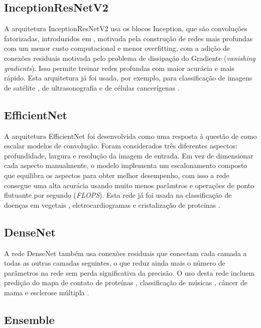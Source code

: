 \subsection{InceptionResNetV2}
\label{section:inceptionresnetv2}
A arquitetura InceptionResNetV2 \cite{InceptionResNetv2} usa os blocos Inception, que são convoluções fatorizadas, introduzidos em \cite{Inception}, motivada pela construção de redes mais profundas com um menor custo computacional e menor overfitting, com a adição de conexões residuais \cite{ResNet} motivada pelo problema de dissipação do Gradiente (\textit{vanishing gradients}). Isso permite treinar redes profundas com maior acurácia e mais rápido. Esta arquitetura já foi usada, por exemplo, para classificação de imagens de satélite \cite{InceptionResNetV2Ex01}, de ultrasonografia \cite{InceptionResNetV2Ex02} e de células cancerígenas \cite{InceptionResNetV2Ex03}.

\subsection{EfficientNet}
\label{section:efficientnet}
A arquitetura EfficientNet \cite{EfficientNet} foi desenvolvida como uma resposta à questão de como escalar modelos de convolução. Foram considerados três diferentes aspectos: profundidade, largura e resolução da imagem de entrada. Em vez de dimensionar cada aspecto manualmente, o modelo implementa um escalonamento composto que equilibra os aspectos para obter melhor desempenho, com isso a rede consegue uma alta acurácia usando muito menos parâmtros e operações de ponto flutuante por segundo (\emph{FLOPS}). Esta rede já foi usada na classificação de doenças em vegetais \cite{EfficientNetEx03}, eletrocardiogramas \cite{EfficientNetEx01} e cristalização de proteínas \cite{EfficientNetEx02}.

\subsection{DenseNet}
\label{section:densenet}
A rede DenseNet \cite{DenseNet} também usa conexões residuais que conectam cada camada a todas as outras camadas seguintes, o que reduz ainda mais o número de parâmetros na rede sem perda significativa da precisão. O uso desta rede incluem predição do mapa de contato de proteínas \cite{DenseNetEx02}, classificação de músicas \cite{DenseNetEx05}, câncer de mama \cite{DenseNetEx01} e esclerose múltipla \cite{DenseNetEx03}.

\subsection{Ensemble}

